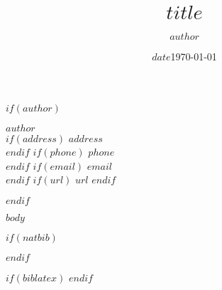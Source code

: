 \documentclass[
  11pt,  %
  a4paper,  %
]{article}
\title{$title$}
\author{$author$}
\date{$date$}
\date{\today}
\begin{document}
\maketitle

$if(author)$
\begin{flushright}
{\large \sffamily \bfseries $author$}\\[.35ex]
$if(address)$
\emph{\small $address$}\\[.35ex]
$endif$
$if(phone)$
\small{$phone$}\\
$endif$
$if(email)$
\small{\href{mailto:$email$}{$email$}}\\
$endif$
$if(url)$
\small{\href{http://$url$}{$url$}}
$endif$
\end{flushright}
$endif$

\vspace{1em}

$body$

$if(natbib)$


$endif$

$if(biblatex)$
\printbibliography
$endif$
\end{document}
